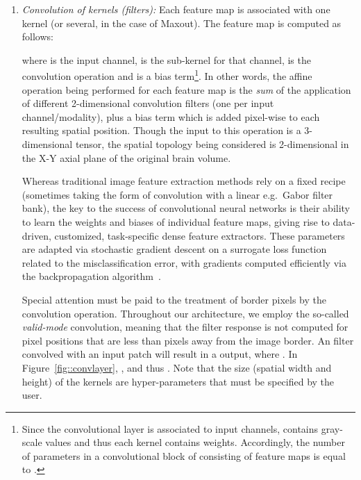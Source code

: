 \documentclass[final,5p,times,twocolumn]{elsarticle}
\begin{document}
\begin{enumerate}

\item {\it Convolution of kernels (filters):} Each feature map  is associated with one kernel (or several, in the case of Maxout). The feature map  is computed as follows:




where  is the  input channel,  is the sub-kernel for that channel,  is the convolution operation and  is a bias term\footnote{Since the convolutional layer is associated to  input channels,  contains  gray-scale values and thus each kernel   contains  weights. Accordingly, the number of parameters in a convolutional block of consisting of  feature maps is equal to .}. In other words, the affine operation being performed for each feature map is the \textit{sum} of the application of  different 2-dimensional  convolution filters (one per input channel/modality), plus a bias term which is added pixel-wise to each resulting spatial position. Though the input to this operation is a  3-dimensional tensor, the spatial topology being considered is 2-dimensional in the X-Y axial plane of the original brain volume.



Whereas traditional image feature extraction methods rely on a fixed recipe (sometimes taking the form of convolution with a linear e.g.\ Gabor filter bank), the key to the success of convolutional neural networks is their ability to learn the weights and biases of individual feature maps, giving rise to data-driven, customized, task-specific dense feature extractors. These parameters are adapted via stochastic gradient descent on a surrogate loss function related to the misclassification error, with gradients computed efficiently via the backpropagation algorithm~\citep{rumelhart1988learning}.

Special attention must be paid to the treatment of border pixels by the convolution operation. Throughout our architecture, we employ the so-called \textit{valid-mode} convolution, meaning that the filter response is not computed for pixel positions that are less than  pixels away from the image border. An  filter convolved with an  input patch will result in a  output, where . In Figure~\ref{fig::convlayer}, ,  and thus . 
Note that the size (spatial width and height) of the kernels are hyper-parameters that must be specified by the user. 






\end{enumerate}
\end{document}
